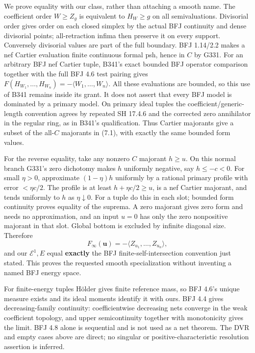 \documentclass[
]{article}
\begin{document}
We prove equality with our class, rather than attaching a smooth name.
The coefficient order \(W\ge Z_g\) is equivalent to \(H_W\ge g\) on all
semivaluations. Divisorial order gives order on each closed simplex by
the actual BFJ continuity and dense divisorial points; all-retraction
infima then preserve it on every support. Conversely divisorial values
are part of the full boundary. BFJ 1.14/2.2 makes a nef Cartier
evaluation finite continuous formal psh, hence in \(C\) by G331. For an
arbitrary BFJ nef Cartier tuple, B341's exact bounded BFJ operator
comparison together with the full BFJ 4.6 test pairing gives
\(F(H_{W_1},\ldots,H_{W_n})=-\langle W_1,\ldots,W_n\rangle\). All these
evaluations are bounded, so this use of B341 remains inside its grant.
It does not assert that every BFJ model is dominated by a primary model.
On primary ideal tuples the coefficient/generic-length convention agrees
by repeated SH 17.4.6 and the corrected zero annihilator in the regular
ring, as in B341's qualification. Thus Cartier majorants give a subset
of the all-\(C\) majorants in (7.1), with exactly the same bounded form
values.

For the reverse equality, take any nonzero \(C\) majorant \(h\ge u\). On
this normal branch G331's zero dichotomy makes \(h\) uniformly negative,
say \(h\le-c<0\). For small \(\eta>0\), approximate \((1-\eta)h\)
uniformly by a rational primary profile with error \(<\eta c/2\). The
profile is at least \(h+\eta c/2\ge u\), is a nef Cartier majorant, and
tends uniformly to \(h\) as \(\eta\downarrow0\). For a tuple do this in
each slot; bounded form continuity proves equality of the suprema. A
zero majorant gives zero form and needs no approximation, and an input
\(u=0\) has only the zero nonpositive majorant in that slot. Global
bottom is excluded by infinite diagonal size. Therefore
\[F_\infty(\boldsymbol u)=-\langle Z_{u_1},\ldots,Z_{u_n}\rangle,\] and
our \(\mathcal E^1,E\) equal \textbf{exactly} the BFJ
finite-self-intersection convention just stated. This proves the
requested smooth specialization without inventing a named BFJ energy
space.

For finite-energy tuples Hölder gives finite reference mass, so BFJ
4.6's unique measure exists and its ideal moments identify it with ours.
BFJ 4.4 gives decreasing-family continuity: coefficientwise decreasing
nets converge in the weak coefficient topology, and upper semicontinuity
together with monotonicity gives the limit. BFJ 4.8 alone is sequential
and is not used as a net theorem. The DVR and empty cases above are
direct; no singular or positive-characteristic resolution assertion is
inferred.
\end{document}
